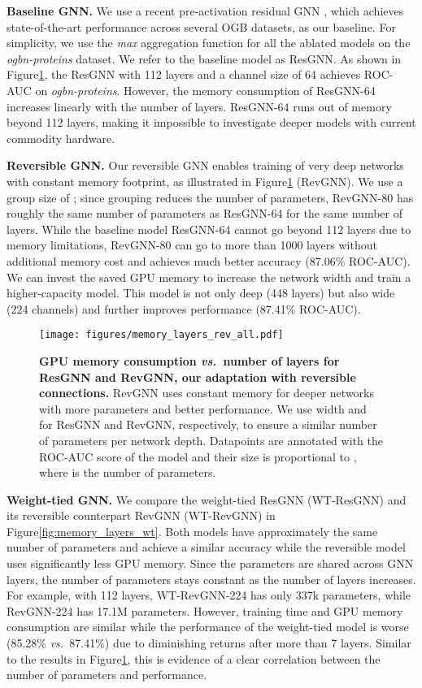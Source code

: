 \documentclass{article}
\newcommand{\vs}{\emph{vs.~}}
\newcommand{\figLabel}{Figure\xspace}
\newcommand{\mysection}[1]{\vspace{0pt}\noindent\textbf{#1.}}
\begin{document}
\mysection{Baseline GNN}
We use a recent pre-activation residual GNN \citep{li2020deepergcn}, which achieves state-of-the-art performance across several OGB datasets, as our baseline. For simplicity, we use the \emph{max} aggregation function for all the ablated models on the \emph{ogbn-proteins} dataset. We refer to the baseline model as ResGNN. As shown in \figLabel \ref{fig:rev_memory_layers}, the ResGNN with 112 layers and a channel size of 64 achieves  ROC-AUC on \emph{ogbn-proteins}. However, the memory consumption of ResGNN-64 increases linearly with the number of layers. ResGNN-64 runs out of memory beyond 112 layers, making it impossible to investigate deeper models with current commodity hardware.


\mysection{Reversible GNN}
Our reversible GNN enables training of very deep networks with constant memory footprint, as illustrated in \figLabel \ref{fig:rev_memory_layers} (RevGNN). We use a group size of ; since grouping reduces the number of parameters, RevGNN-80 has roughly the same number of parameters as ResGNN-64 for the same number of layers. While the baseline model ResGNN-64 cannot go beyond 112 layers due to memory limitations, RevGNN-80 can go to more than 1000 layers without additional memory cost and achieves much better accuracy (87.06\% ROC-AUC). 
We can invest the saved GPU memory to increase the network width and train a higher-capacity model. This model is not only deep (448 layers) but also wide (224 channels) and further improves performance (87.41\% ROC-AUC).

\begin{figure}[!t]
    \centering
    \texttt{[image: figures/memory\_layers\_rev\_all.pdf]}
    \caption{\textbf{GPU memory consumption \vs number of layers for ResGNN \citep{li2020deepergcn} and RevGNN, our adaptation with reversible connections.} RevGNN uses constant memory for deeper networks with more parameters and better performance. We use width  and  for ResGNN and RevGNN, respectively, to ensure a similar number of parameters per network depth. Datapoints are annotated with the ROC-AUC score of the model and their size is proportional to , where  is the number of parameters.}
    \label{fig:rev_memory_layers}
\end{figure}

\mysection{Weight-tied GNN}
We compare the weight-tied ResGNN (WT-ResGNN) and its reversible counterpart RevGNN (WT-RevGNN) in \figLabel \ref{fig:memory_layers_wt}. Both models have approximately the same number of parameters and achieve a similar accuracy while the reversible model uses significantly less GPU memory. Since the parameters are shared across GNN layers, the number of parameters stays constant as the number of layers increases. For example, with 112 layers, WT-RevGNN-224 has only 337k parameters, while RevGNN-224 has 17.1M parameters. However, training time and GPU memory consumption are similar while the performance of the weight-tied model is worse (85.28\% \vs 87.41\%) due to diminishing returns after more than 7 layers. Similar to the results in \figLabel \ref{fig:rev_memory_layers}, this is evidence of a clear correlation between the number of parameters and performance.  
\end{document}
